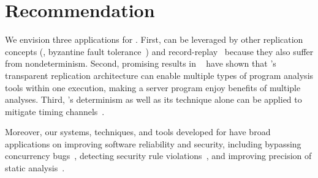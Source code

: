 

\section{Recommendation} \label{sec:recommendation}
We envision three applications for \xxx. First, \xxx can 
be leveraged by other replication concepts (\eg, byzantine fault 
tolerance~\cite{pbft:osdi99, zyzzyva:sosp07}) 
and record-replay~\cite{scribe:sigmetrics10, racepro:sosp11, respec:asplos10} 
because they also suffer from nondeterminism. Second, promising 
results in \repframe~\cite{repframe:apsys15} have shown that \xxx's transparent 
replication architecture can enable multiple types of program analysis tools 
within one execution, making a server program enjoy benefits of multiple 
analyses. Third, \xxx's determinism as well as its \timealgo technique alone 
can be applied to mitigate timing channels~\cite{Askarov:ccs10, Zhang:ccs11, 
Aviram:ccsw10}.

Moreover, our systems, techniques, and tools developed 
for \xxx have broad applications on improving software reliability and 
security, including bypassing concurrency bugs~\cite{wu:loom:osdi10}, detecting 
security rule violations~\cite{woodpecker:asplos13}, and improving precision of 
static analysis~\cite{wu:pldi12}. 
